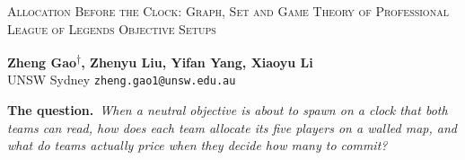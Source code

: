 \documentclass[10pt,letterpaper]{article}
\theoremstyle{flood}
\begin{document}
{\raggedright\fontsize{15}{18}\selectfont\scshape
Allocation Before the Clock: Graph, Set and Game Theory of Professional League of Legends Objective Setups\par}
\vspace{6pt}
{\bfseries Zheng Gao\textsuperscript{$\dagger$}, Zhenyu Liu, Yifan Yang, Xiaoyu Li}\\
UNSW Sydney  {\small\texttt{zheng.gao1@unsw.edu.au}}
\vspace{2pt}



\begin{questionbox}
\textbf{The question.}\ \emph{When a neutral objective is about to spawn on a clock that both teams can read, how does each team allocate its five players on a walled map, and what do teams actually price when they decide how many to commit?}
\end{questionbox}










{\small
\setlength{\bibsep}{2.5pt plus 0.5pt}


}

\clearpage
\appendix

\end{document}
